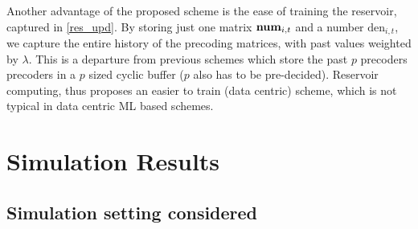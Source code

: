 \documentclass[conference]{IEEEtran}
\newcommand{\highlight}[1]{%
  \colorbox{red!50}{$\displaystyle#1$}}
\begin{document}

{Another advantage of the proposed scheme is the ease of training the reservoir, captured in \eqref{res_upd}.
By storing just one matrix $\text{\textbf{num}}_{i,t}$ and a number $\text{den}_{i,t}$, we capture the entire history of the precoding matrices, with past values weighted by $\lambda$.
This is a departure from previous schemes \cite{Gupt1905:Predictive,6891198,6545375} which store the past $p$ precoders precoders in a $p$ sized cyclic buffer ($p$ also has to be pre-decided).
Reservoir computing, thus proposes an easier to train (data centric) scheme, which is not typical in data centric ML based schemes.
}

\section{Simulation Results}
\label{section4}

\subsection{Simulation setting considered}
\label{setting}
\end{document}
